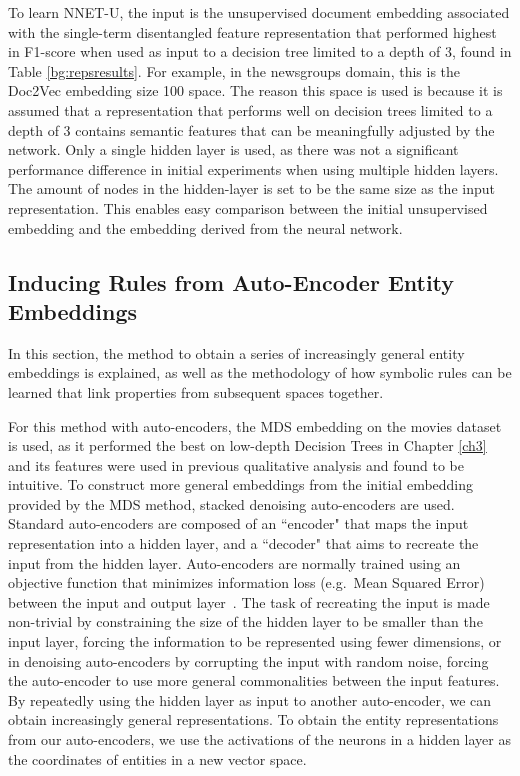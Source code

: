 To learn NNET-U, the input is the unsupervised document embedding associated with the single-term disentangled feature representation that performed highest in F1-score when used as input to a  decision tree limited to a depth of 3,  found in Table \ref{bg:repsresults}. For example, in the newsgroups domain, this is the Doc2Vec embedding size 100 space. The reason this space is used is because it is assumed that a representation that performs well on  decision trees limited to a depth of 3 contains semantic features that can be meaningfully adjusted by the network. Only a single hidden layer is used, as there was not a significant performance difference in initial experiments when using multiple hidden layers. The amount of nodes in the hidden-layer is set to be the same size as the input representation. This enables easy comparison between the initial unsupervised embedding and the embedding derived from the neural network.







\subsection{Inducing Rules from Auto-Encoder Entity Embeddings}\label{InducingRulesFromEntityEmbeddings}

In this section, the method to obtain a series of increasingly general entity embeddings is explained, as well as the methodology of how symbolic rules can be learned that link properties from subsequent spaces together. 

For this method with auto-encoders, the MDS embedding on the movies dataset is used, as it performed the best on low-depth Decision Trees in Chapter \ref{ch3} and its features were used in previous qualitative analysis and found to be intuitive. To construct more general embeddings from the initial embedding provided by the MDS method, stacked denoising auto-encoders \cite{Vincent2008a} are used. Standard auto-encoders are composed of an ``encoder" that maps the input representation into a hidden layer, and a ``decoder" that aims to recreate the input from the hidden layer. Auto-encoders are normally trained using an objective function that minimizes information loss (e.g.\ Mean Squared Error) between the input and output layer~\cite{Bengio2009}. The task of recreating the input is made non-trivial by constraining the size of the hidden layer to be smaller than the input layer, forcing the information to be represented using fewer dimensions, or in denoising auto-encoders by corrupting the input with random noise, forcing the auto-encoder to use more general commonalities between the input features. By repeatedly  using the hidden layer as input to another auto-encoder, we can obtain increasingly general representations. To obtain the entity representations from our auto-encoders, we use the activations of the neurons in a hidden layer as the coordinates of entities in a new vector space. 

